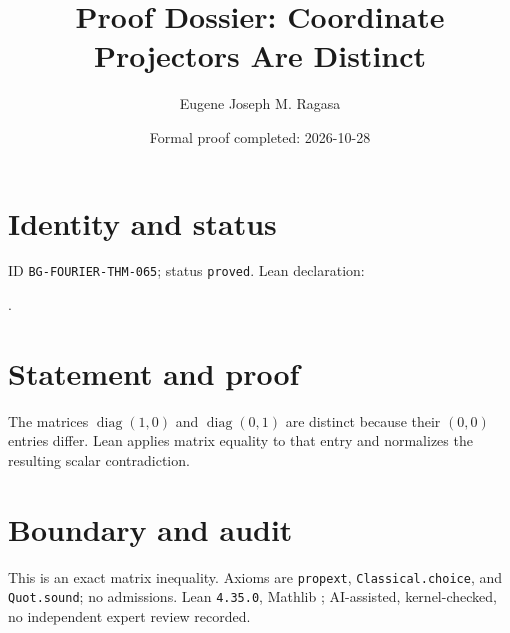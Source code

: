 \documentclass[11pt]{article}
\title{Proof Dossier: Coordinate Projectors Are Distinct}\author{Eugene Joseph M. Ragasa}\date{Formal proof completed: 2026-10-28}
\begin{document}
\raggedright\maketitle
\section{Identity and status}
ID \texttt{BG-FOURIER-THM-065}; status \texttt{proved}. Lean declaration:
\par{}.
\section{Statement and proof}
The matrices $\operatorname{diag}(1,0)$ and $\operatorname{diag}(0,1)$ are distinct because their $(0,0)$ entries differ. Lean applies matrix equality to that entry and normalizes the resulting scalar contradiction.
\section{Boundary and audit}
This is an exact matrix inequality. Axioms are \texttt{propext}, \texttt{Classical.choice}, and \texttt{Quot.sound}; no admissions. Lean \texttt{4.35.0}, Mathlib {\scriptsize{}}; AI-assisted, kernel-checked, no independent expert review recorded.
\end{document}
